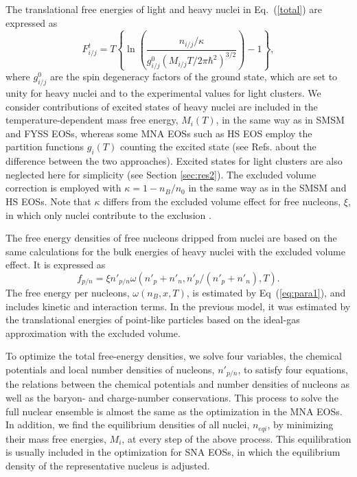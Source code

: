 \documentclass[preprint]{revtex4}
\begin{document}
The translational free energies of light and heavy nuclei in Eq.~(\ref{total}) are
expressed as 
\begin{equation}%
\label{eq:tra}
 F_{i/j}^{t} = T \left\{ \ln \left(\frac{ n_{i/j}/\kappa}{g_{i/j}^0 (M_{i/j} T/2\pi \hbar ^2 )^{3/2}  }\right)- 1 \right\} , 
\end{equation}
where  
$g_{i/j}^0$  are the spin degeneracy factors of the ground state, which are set to unity  for heavy nuclei and  to the experimental values for light clusters.
{%
We consider contributions of excited states of heavy nuclei are included in the temperature-dependent mass free energy, $M_i(T)$, in the same way as in SMSM  and FYSS EOSs, 
whereas some MNA EOSs such as HS EOS %
 employ  the partition functions $g_i(T)$ counting the excited state  (see Refs. \cite{buyukcizmeci13,furusawa13a} about the difference between the two approaches).
Excited states for light clusters are also neglected here for simplicity (see Section \ref{sec:res2}).
 The excluded volume correction is employed with $\kappa=1-n_B/n_0$
in the same way as in the SMSM and HS EOSs.
Note that  $\kappa$  differs from the excluded volume effect for free nucleons, $\xi$,
in which only nuclei contribute to the exclusion \cite{hempel10}.} %

{%
The free energy densities of 
free nucleons dripped from nuclei
are 
based on the same calculations for 
the bulk energies of heavy nuclei 
with the excluded volume effect. 
It  is expressed  as 
\begin{equation} 
\label{eq:pn}
f_{p/n}=\xi n'_{p/n} \omega(n'_p+n'_n, n'_p/(n'_p+n'_n),T).
\end{equation}
 The free energy per nucleons, $\omega(n_B,x,T)$, is estimated by Eq~(\ref{eq:para1}), and includes kinetic and interaction terms.}  
In the previous model, it was estimated by the translational energies of point-like particles based on the ideal-gas approximation with the  excluded volume.

To optimize  the total free-energy densities, we solve four variables, the chemical potentials and local number densities of nucleons, $n'_{p/n}$, to satisfy four equations,
 the relations between the chemical potentials and number densities of nucleons as well as the baryon- and charge-number conservations.
This process  to solve the full nuclear ensemble is almost the same as the optimization in the MNA EOSs.  
In addition, we find the equilibrium  densities of all nuclei, $n_{eqi}$, by minimizing their  mass free energies, $M_i$,  at every step of the above process.
This equilibration  is usually included in the optimization for SNA EOSs, in which the equilibrium density of the representative nucleus is adjusted.
\end{document}
